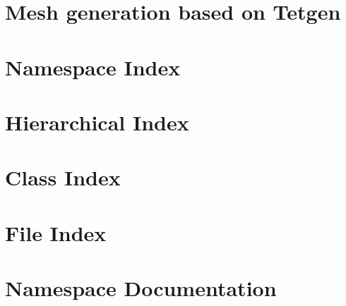 \let\mypdfximage\pdfximage\def\pdfximage{\immediate\mypdfximage}\documentclass[twoside]{book}
\newcommand{\+}{\discretionary{\mbox{\scriptsize$\hookleftarrow$}}{}{}}
\begin{document}
\hypersetup{pageanchor=false,
             bookmarksnumbered=true,
             pdfencoding=unicode
            }
\hypersetup{pageanchor=true}

\chapter{Mesh generation based on Tetgen}
\label{index}\hypertarget{index}{}
\chapter{Namespace Index}

\chapter{Hierarchical Index}

\chapter{Class Index}

\chapter{File Index}

\chapter{Namespace Documentation}




\end{document}
